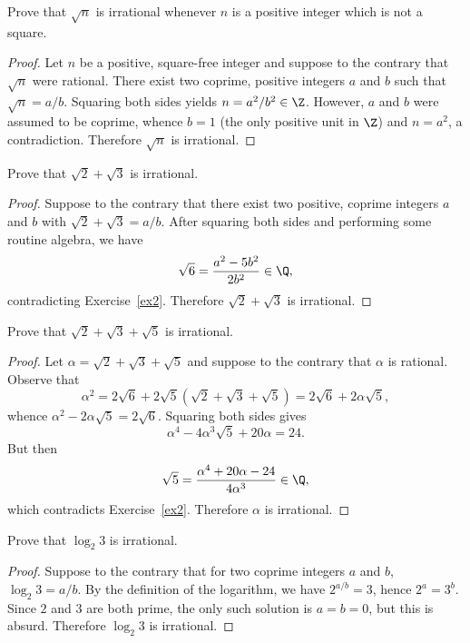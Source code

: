 \documentclass[10pt]{amsart}
\begin{document}
\begin{thm}\label{ex2}
  Prove that $\sqrt{n}$ is irrational whenever $n$ is a positive integer which is not a square.

  \begin{proof}
    Let $n$ be a positive, square-free integer and suppose to the contrary that $\sqrt{n}$ were rational.
    There exist two coprime, positive integers $a$ and $b$ such that $\sqrt{n} = a/b$.
    Squaring both sides yields $n = a^2/b^2 \in \Z$.
    However, $a$ and $b$ were assumed to be coprime, whence $b = 1$ (the only positive unit in $\Z$) and $n = a^2$, a contradiction.
    Therefore $\sqrt{n}$ is irrational.
  \end{proof}
\end{thm}

\begin{thm}\label{ex3}
  Prove that $\sqrt{2} + \sqrt{3}$ is irrational.

  \begin{proof}
    Suppose to the contrary that there exist two positive, coprime integers $a$ and $b$ with $\sqrt{2} + \sqrt{3} = a/b$.
    After squaring both sides and performing some routine algebra, we have 
    $$\sqrt{6} = \frac{a^2 - 5b^2}{2b^2} \in \Q,$$
    contradicting Exercise~\ref{ex2}.
    Therefore $\sqrt{2} + \sqrt{3}$ is irrational.
  \end{proof}
\end{thm}

\begin{thm}\label{ex4}
  Prove that $\sqrt{2} + \sqrt{3} + \sqrt{5}$ is irrational.
  
  \begin{proof}
    Let $\alpha = \sqrt{2} + \sqrt{3} + \sqrt{5}$ and suppose to the contrary that $\alpha$ is rational.
    Observe that
    $$\alpha^2 = 2\sqrt{6} + 2\sqrt{5}(\sqrt{2} + \sqrt{3} + \sqrt{5}) = 2\sqrt{6} + 2\alpha\sqrt{5},$$
    whence $\alpha^2 - 2\alpha\sqrt{5} = 2\sqrt{6}$.
    Squaring both sides gives 
    $$\alpha^4 - 4\alpha^3\sqrt{5} + 20\alpha = 24.$$
    But then
    $$\sqrt{5} = \frac{\alpha^4 + 20\alpha - 24}{4\alpha^3} \in \Q,$$
    which contradicts Exercise~\ref{ex2}.
    Therefore $\alpha$ is irrational.
  \end{proof}
\end{thm}  

\begin{thm}\label{ex5}
  Prove that $\log_2{3}$ is irrational.
  
  \begin{proof}
    Suppose to the contrary that for two coprime integers $a$ and $b$, $\log_2{3} = a/b$.
    By the definition of the logarithm, we have $2^{a/b} = 3$, hence $2^a = 3^b$.
    Since $2$ and $3$ are both prime, the only such solution is $a = b = 0$, but this is absurd.
    Therefore $\log_2{3}$ is irrational.
  \end{proof}
\end{thm}
\end{document}

